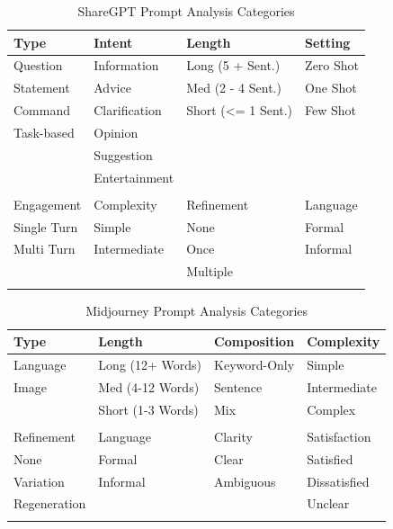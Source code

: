 \begin{table}[]
    \centering
    \caption{ShareGPT Prompt Analysis Categories}
    \begin{tabular}{@{}llll@{}}
        \toprule
        Type        & Intent        & Length             & Setting   \\ \midrule
        Question    & Information   & Long (5 + Sent.)   & Zero Shot \\
        Statement   & Advice        & Med (2 - 4 Sent.)  & One Shot  \\
        Command     & Clarification & Short (<= 1 Sent.) & Few Shot  \\
        Task-based  & Opinion       &                    &           \\
        & Suggestion    &                    &           \\
        & Entertainment &                    &           \\
        &               &                    &           \\
        \toprule
        Engagement  & Complexity    & Refinement         & Language  \\ \midrule
        Single Turn & Simple        & None               & Formal    \\
        Multi Turn  & Intermediate  & Once               & Informal  \\
        &               & Multiple            &           \\ \\
        \bottomrule
    \end{tabular}
    \label{tab:sharegpt-prompt-analysis-categories}
\end{table}

\begin{table}[]
    \centering
    \caption{Midjourney Prompt Analysis Categories}
    \begin{tabular}{@{}llll@{}}
        \toprule
        Type         & Length            & Composition  & Complexity   \\ \midrule
        Language     & Long (12+ Words)  & Keyword-Only & Simple       \\
        Image        & Med (4-12 Words)  & Sentence     & Intermediate \\
        & Short (1-3 Words) & Mix          & Complex      \\
        \\
        \toprule
        Refinement          & Language & Clarity & Satisfaction \\
        \midrule
        None & Formal & Clear & Satisfied \\
        Variation          & Informal & Ambiguous & Dissatisfied \\
        Regeneration & & & Unclear \\\\
        \bottomrule
    \end{tabular}
    \label{tab:midjourney-prompt-analysis-categories}
\end{table}

